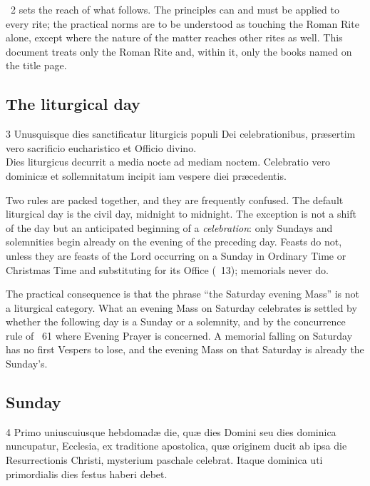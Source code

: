~2 sets the reach of what follows. The principles can and must be applied to every rite;
the practical norms are to be understood as touching the Roman Rite alone, except where the nature
of the matter reaches other rites as well. This document treats only the Roman Rite and, within it,
only the books named on the title page.

\subsection{The liturgical day}

\begin{normtext}{ 3}
Unusquisque dies sanctificatur liturgicis populi Dei celebrationibus, præsertim vero sacrificio
eucharistico et Officio divino.\\
Dies liturgicus decurrit a media nocte ad mediam noctem. Celebratio vero dominicæ et
sollemnitatum incipit iam vespere diei præcedentis.
\end{normtext}

Two rules are packed together, and they are frequently confused. The default liturgical day is the
civil day, midnight to midnight. The exception is not a shift of the day but an anticipated
beginning of a \emph{celebration}: only Sundays and solemnities begin already on the evening of the
preceding day. Feasts do not, unless they are feasts of the Lord occurring on a Sunday in Ordinary
Time or Christmas Time and substituting for its Office (~13); memorials never do.

The practical consequence is that the phrase ``the Saturday evening Mass'' is not a liturgical
category. What an evening Mass on Saturday celebrates is settled by whether the following day is a
Sunday or a solemnity, and by the concurrence rule of ~61 where Evening Prayer is
concerned. A memorial falling on Saturday has no first Vespers to lose, and the evening Mass on
that Saturday is already the Sunday's.

\subsection{Sunday}

\begin{normtext}{ 4}
Primo uniuscuiusque hebdomadæ die, quæ dies Domini seu dies dominica nuncupatur, Ecclesia, ex
traditione apostolica, quæ originem ducit ab ipsa die Resurrectionis Christi, mysterium paschale
celebrat. Itaque dominica uti primordialis dies festus haberi debet.
\end{normtext}

